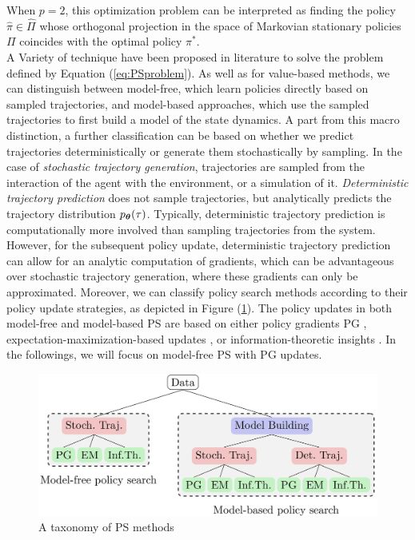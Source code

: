 When $p=2$, this optimization problem can be interpreted as finding the policy $\hat{\pi}\in\hat{\Pi}$ whose orthogonal projection in the space of Markovian stationary policies $\Pi$ coincides with the optimal policy $\pi^*$. \\
A Variety of technique have been proposed in literature to solve the problem defined by Equation (\ref{eq:PSproblem}). As well as for value-based methods, we can distinguish between model-free, which learn policies directly based on sampled trajectories, and model-based approaches, which use the sampled trajectories to first build a model of the state dynamics. A part from this macro distinction, a further classification can be based on whether we predict trajectories deterministically or generate them stochastically by sampling. In the case of \emph{stochastic trajectory generation}, trajectories are sampled from the interaction of the agent with the environment, or a simulation of it.\emph{ Deterministic  trajectory  prediction}  does  not  sample  trajectories, but analytically predicts the trajectory distribution $p_{\boldsymbol{\theta}}(\tau)$. Typically, deterministic  trajectory  prediction  is  computationally  more  involved than  sampling  trajectories  from  the  system.  However,  for  the  subsequent policy update, deterministic trajectory prediction can allow for an analytic  computation  of  gradients,  which  can  be  advantageous  over stochastic trajectory generation, where these gradients can only be approximated. Moreover, we can classify policy search methods according to their policy update strategies, as depicted in Figure (\ref{fig:PStaxonomy}). The policy updates in both model-free and model-based \gls{PS} are based on either policy gradients \gls{PG} \cite{sutton2000policy}, expectation-maximization-based updates \cite{dayan1997using, kober2009policy}, or information-theoretic insights \cite{still2012information}. In the followings, we will focus on model-free \gls{PS} with \gls{PG} updates.

\begin{figure}[t!]
\centering
\includegraphics[width=\textwidth,height=\textheight,keepaspectratio]{Images/ps_taxonomy.png}
\caption{A taxonomy of \gls{PS} methods \cite{deisenroth2013survey}} \label{fig:PStaxonomy}
\end{figure}



